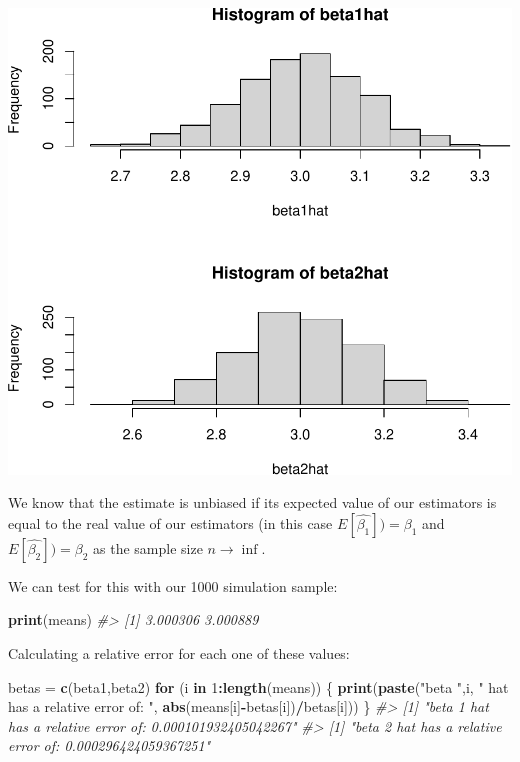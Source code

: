 \documentclass[]{article}
\newenvironment{Shaded}{\begin{snugshade}}{\end{snugshade}}
\newcommand{\CommentTok}[1]{\textcolor[rgb]{0.56,0.35,0.01}{\textit{#1}}}
\newcommand{\ControlFlowTok}[1]{\textcolor[rgb]{0.13,0.29,0.53}{\textbf{#1}}}
\newcommand{\DecValTok}[1]{\textcolor[rgb]{0.00,0.00,0.81}{#1}}
\newcommand{\KeywordTok}[1]{\textcolor[rgb]{0.13,0.29,0.53}{\textbf{#1}}}
\newcommand{\NormalTok}[1]{#1}
\newcommand{\OperatorTok}[1]{\textcolor[rgb]{0.81,0.36,0.00}{\textbf{#1}}}
\newcommand{\StringTok}[1]{\textcolor[rgb]{0.31,0.60,0.02}{#1}}
\begin{document}
\includegraphics{./figures/unnamed-chunk-4-1.pdf}

We know that the estimate is unbiased if its expected value of our
estimators is equal to the real value of our estimators (in this case
\(E[ \hat{\beta_{1}}]) = \beta_{1}\) and
\(E[ \hat{\beta_{2}}]) = \beta_{2}\) as the sample size
\(n \rightarrow \inf\).

We can test for this with our 1000 simulation sample:

\begin{Shaded}
\begin{Highlighting}[]
\KeywordTok{print}\NormalTok{(means)}
\CommentTok{#> [1] 3.000306 3.000889}
\end{Highlighting}
\end{Shaded}

Calculating a relative error for each one of these values:

\begin{Shaded}
\begin{Highlighting}[]
\NormalTok{betas =}\StringTok{ }\KeywordTok{c}\NormalTok{(beta1,beta2)}
\ControlFlowTok{for}\NormalTok{ (i }\ControlFlowTok{in} \DecValTok{1}\OperatorTok{:}\KeywordTok{length}\NormalTok{(means)) \{}
    \KeywordTok{print}\NormalTok{(}\KeywordTok{paste}\NormalTok{(}\StringTok{"beta "}\NormalTok{,i, }\StringTok{" hat has a relative error of: "}\NormalTok{, }\KeywordTok{abs}\NormalTok{(means[i]}\OperatorTok{-}\NormalTok{betas[i])}\OperatorTok{/}\NormalTok{betas[i]))}
\NormalTok{\}   }
\CommentTok{#> [1] "beta  1  hat has a relative error of:  0.000101932405042267"}
\CommentTok{#> [1] "beta  2  hat has a relative error of:  0.000296424059367251"}
\end{Highlighting}
\end{Shaded}
\end{document}
